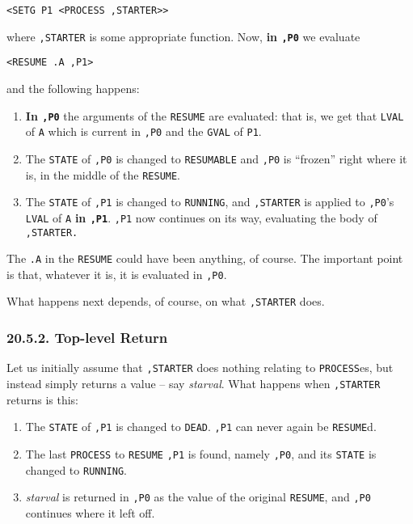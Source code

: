 \documentclass[a4paper,]{article}
\providecommand{\tightlist}{%
  \setlength{\itemsep}{0pt}\setlength{\parskip}{0pt}}
\begin{document}
\begin{verbatim}
<SETG P1 <PROCESS ,STARTER>>
\end{verbatim}

where \texttt{,STARTER} is some appropriate function. Now, \textbf{in \texttt{,P0}} we evaluate

\begin{verbatim}
<RESUME .A ,P1>
\end{verbatim}

and the following happens:

\begin{enumerate}
\def\labelenumi{\arabic{enumi}.}
\tightlist
\item
  \textbf{In \texttt{,P0}} the arguments of the \texttt{RESUME} are evaluated: that is, we get that \texttt{LVAL} of
  \texttt{A} which is current in \texttt{,P0} and the \texttt{GVAL} of \texttt{P1}.
\item
  The \texttt{STATE} of \texttt{,P0} is changed to \texttt{RESUMABLE} and \texttt{,P0} is ``frozen'' right where it is, in
  the middle of the \texttt{RESUME}.
\item
  The \texttt{STATE} of \texttt{,P1} is changed to \texttt{RUNNING}, and \texttt{,STARTER} is applied to \texttt{,P0}'s
  \texttt{LVAL} of \texttt{A} \textbf{in \texttt{,P1}}. \texttt{,P1} now continues on its way, evaluating the body of
  \texttt{,STARTER.}
\end{enumerate}

The \texttt{.A} in the \texttt{RESUME} could have been anything, of course. The important point is that, whatever it is, it
is evaluated in \texttt{,P0}.

What happens next depends, of course, on what \texttt{,STARTER} does.

\subsubsection{20.5.2. Top-level Return}\label{top-level-return}

Let us initially assume that \texttt{,STARTER} does nothing relating to \texttt{PROCESS}es, but instead simply returns a
value -- say \emph{starval}. What happens when \texttt{,STARTER} returns is this:

\begin{enumerate}
\def\labelenumi{\arabic{enumi}.}
\tightlist
\item
  The \texttt{STATE} of \texttt{,P1} is changed to \texttt{DEAD}. \texttt{,P1} can never again be \texttt{RESUME}d.
\item
  The last \texttt{PROCESS} to \texttt{RESUME} \texttt{,P1} is found, namely \texttt{,P0}, and its \texttt{STATE} is
  changed to \texttt{RUNNING}.
\item
  \emph{starval} is returned in \texttt{,P0} as the value of the original \texttt{RESUME}, and \texttt{,P0} continues where
  it left off.
\end{enumerate}
\end{document}
